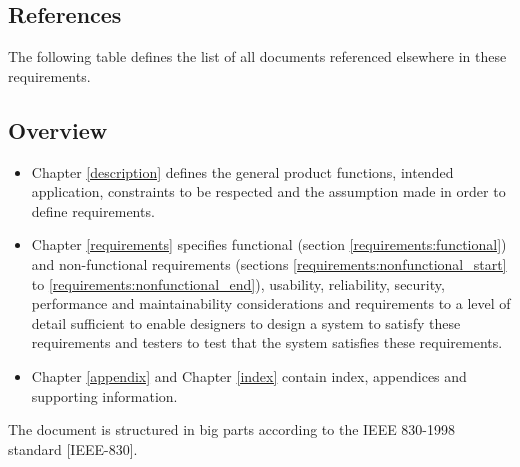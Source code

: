 \subsection{References}
\label{intro:references}
The following table defines the list of all documents referenced elsewhere in these requirements.

\begin{reference_table}
\end{reference_table}


\subsection{Overview}
\label{intro:overview}
\begin{itemize}
  \item Chapter \ref{description} defines the general product functions, intended application, constraints to be respected and the assumption made in order to define requirements.
  \item Chapter \ref{requirements} specifies functional (section \ref{requirements:functional}) and non-functional requirements (sections \ref{requirements:nonfunctional_start} to \ref{requirements:nonfunctional_end}), usability, reliability, security, performance and maintainability considerations and requirements to a level of detail sufficient to enable designers to design a system to satisfy these requirements and testers to test that the system satisfies these requirements. %
  \item Chapter \ref{appendix} and Chapter \ref{index} contain index, appendices and supporting information.
\end{itemize}
The document is structured in big parts according to the IEEE 830-1998 standard [IEEE-830].
